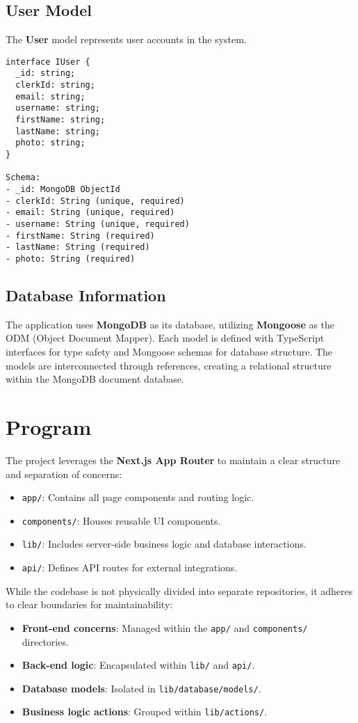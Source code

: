 \subsection{User Model}

The \textbf{User} model represents user accounts in the system.

\begin{lstlisting}[style=typescript, caption={User Model Interface}]
interface IUser {
  _id: string;
  clerkId: string;
  email: string;
  username: string;
  firstName: string;
  lastName: string;
  photo: string;
}

Schema:
- _id: MongoDB ObjectId
- clerkId: String (unique, required)
- email: String (unique, required)
- username: String (unique, required)
- firstName: String (required)
- lastName: String (required)
- photo: String (required)
\end{lstlisting}

\subsection{Database Information}

The application uses \textbf{MongoDB} as its database, utilizing \textbf{Mongoose} as the ODM (Object Document Mapper). Each model is defined with TypeScript interfaces for type safety and Mongoose schemas for database structure. The models are interconnected through references, creating a relational structure within the MongoDB document database.


\section{Program}

The project leverages the \textbf{Next.js App Router} to maintain a clear structure and separation of concerns:
\begin{itemize}
    \item \texttt{app/}: Contains all page components and routing logic.
    \item \texttt{components/}: Houses reusable UI components.
    \item \texttt{lib/}: Includes server-side business logic and database interactions.
    \item \texttt{api/}: Defines API routes for external integrations.
\end{itemize}


While the codebase is not physically divided into separate repositories, it adheres to clear boundaries for maintainability:
\begin{itemize}
    \item \textbf{Front-end concerns}: Managed within the \texttt{app/} and \texttt{components/} directories.
    \item \textbf{Back-end logic}: Encapsulated within \texttt{lib/} and \texttt{api/}.
    \item \textbf{Database models}: Isolated in \texttt{lib/database/models/}.
    \item \textbf{Business logic actions}: Grouped within \texttt{lib/actions/}.
\end{itemize}



